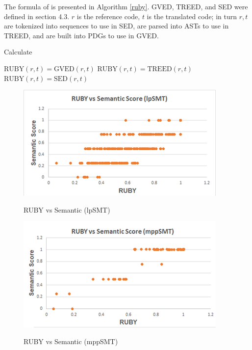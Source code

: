 The formula of {\model} is presented in Algorithm \ref{ruby}. GVED, TREED, and SED were defined in section 4.3. $r$ is the reference code, $t$ is the translated code; in turn $r,t$ are tokenized into sequences to use in SED, are parsed into ASTs to use in TREED, and are built into PDGs to use in GVED.  
\makeatletter
\def\BState{\State\hskip-\ALG@thistlm}
\makeatother
\begin{algorithm}
\caption{Calculate {\model}}\label{ruby}
\begin{algorithmic}[1]
\State $\mbox{RUBY}\left(r,t\right) = \mbox{GVED}\left(r,t\right) $
\State $\mbox{RUBY}\left(r,t\right) = \mbox{TREED}\left(r,t\right) $
\Else 
\State $\mbox{RUBY}\left(r,t\right) = \mbox{SED}\left(r,t\right) $
\EndIf
\end{algorithmic}
\end{algorithm}


\begin{figure}
\caption{RUBY vs Semantic (lpSMT)}
\centering
\includegraphics{img/rubyvssem_lpSMT.png}
\label{fig:RubySemlpSMT}
\end{figure}

\begin{figure}
\caption{RUBY vs Semantic (mppSMT)}
\centering
\includegraphics{img/rubyvssem_mppSMT.png}
\label{fig:RubySemMppSMT}
\end{figure}

